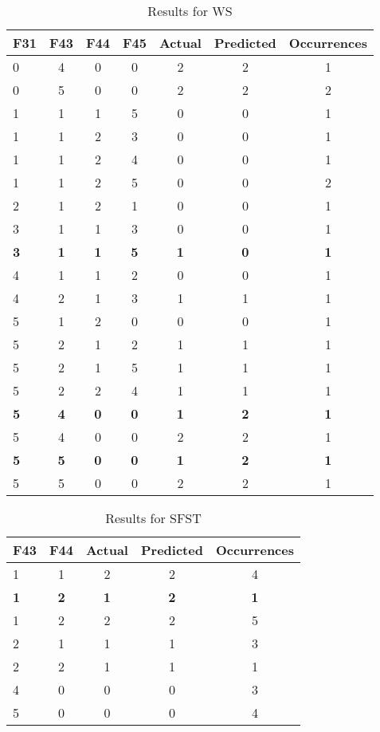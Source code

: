\begin{table}[htbp]
\centering
\begin{tabular}{|l|c|c|c|c|c|c|}
\hline
F31 & F43 & F44 & F45 & Actual & Predicted & Occurrences \\
\hline
0 & 4 & 0 & 0 & 2 & 2 & 1 \\
0 & 5 & 0 & 0 & 2 & 2 & 2 \\
1 & 1 & 1 & 5 & 0 & 0 & 1 \\
1 & 1 & 2 & 3 & 0 & 0 & 1 \\
1 & 1 & 2 & 4 & 0 & 0 & 1 \\
1 & 1 & 2 & 5 & 0 & 0 & 2 \\
2 & 1 & 2 & 1 & 0 & 0 & 1 \\
3 & 1 & 1 & 3 & 0 & 0 & 1 \\
\textbf{3} & \textbf{1} & \textbf{1} & \textbf{5} & \textbf{1} & \textbf{0} & \textbf{1} \\
4 & 1 & 1 & 2 & 0 & 0 & 1 \\
4 & 2 & 1 & 3 & 1 & 1 & 1 \\
5 & 1 & 2 & 0 & 0 & 0 & 1 \\
5 & 2 & 1 & 2 & 1 & 1 & 1 \\
5 & 2 & 1 & 5 & 1 & 1 & 1 \\
5 & 2 & 2 & 4 & 1 & 1 & 1 \\
\textbf{5} & \textbf{4} & \textbf{0} & \textbf{0} & \textbf{1} & \textbf{2} & \textbf{1} \\
5 & 4 & 0 & 0 & 2 & 2 & 1 \\
\textbf{5} & \textbf{5} & \textbf{0} & \textbf{0} & \textbf{1} & \textbf{2} & \textbf{1} \\
5 & 5 & 0 & 0 & 2 & 2 & 1 \\
\hline
\end{tabular}
\caption{Results for WS}
\label{tab_analysis:WS_results}
\end{table}

\begin{table}[htbp]
\centering
\begin{tabular}{|l|c|c|c|c|}
\hline
F43 & F44 & Actual & Predicted & Occurrences \\
\hline
1 & 1 & 2 & 2 & 4 \\
\textbf{1} & \textbf{2} & \textbf{1} & \textbf{2} & \textbf{1} \\
1 & 2 & 2 & 2 & 5 \\
2 & 1 & 1 & 1 & 3 \\
2 & 2 & 1 & 1 & 1 \\
4 & 0 & 0 & 0 & 3 \\
5 & 0 & 0 & 0 & 4 \\
\hline
\end{tabular}
\caption{Results for SFST}
\label{tab_analysis:SFST_results}
\end{table}

